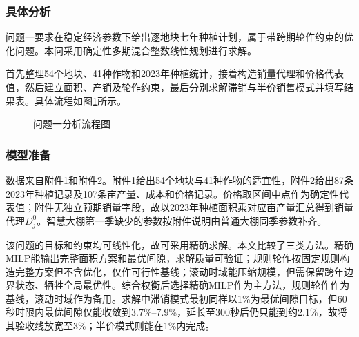 \subsubsection{具体分析}

问题一要求在稳定经济参数下给出逐地块七年种植计划，属于带跨期轮作约束的优化问题。本问采用确定性多期混合整数线性规划进行求解。

首先整理54个地块、41种作物和2023年种植统计，接着构造销量代理和价格代表值，然后建立面积、产销及轮作约束，最后分别求解滞销与半价销售模式并填写结果表。具体流程如图\ref{fig:analysis1_flow}所示。

\begin{figure}[H]
  \begin{center}
    \caption{问题一分析流程图}
    \label{fig:analysis1_flow}
  \end{center}
\end{figure}

\subsubsection{模型准备}

数据来自附件1和附件2。附件1给出54个地块与41种作物的适宜性，附件2给出87条2023年种植记录及107条亩产量、成本和价格记录。价格取区间中点作为确定性代表值；附件无独立预期销量字段，故以2023年种植面积乘对应亩产量汇总得到销量代理$D_j^0$。智慧大棚第一季缺少的参数按附件说明由普通大棚同季参数补齐。

该问题的目标和约束均可线性化，故可采用精确求解。本文比较了三类方法。精确MILP能输出完整面积方案和最优间隙，求解质量可验证；规则轮作按固定规则构造完整方案但不含优化，仅作可行性基线；滚动时域能压缩规模，但需保留跨年边界状态、牺牲全局最优性。综合权衡后选择精确MILP作为主方法，规则轮作作为基线，滚动时域作为备用。求解中滞销模式最初同样以1\%为最优间隙目标，但60秒时限内最优间隙仅能收敛到3.7\%--7.9\%，延长至300秒后仍只能到约2.1\%，故将其验收线放宽至3\%；半价模式则能在1\%内完成。
